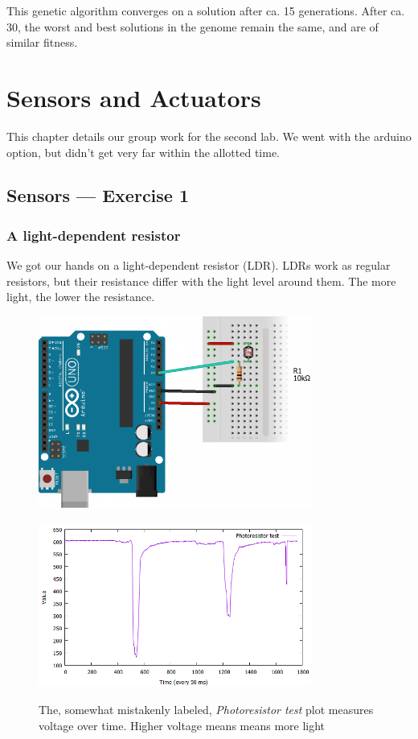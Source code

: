 \documentclass[a4paper, titlepage]{report}
\renewcommand{\%}{\scalebox{.9}{\oldpct}}
\begin{document}
This genetic algorithm converges on a solution after ca. 15 generations. After ca. 30, the worst and best solutions in the genome remain the same, and are of similar fitness.

\chapter{Sensors and Actuators}
This chapter details our group work for the second lab.
We went with the arduino option, but didn't get very far within the allotted
time.

\section*{Sensors --- Exercise 1}
\subsection*{A light-dependent resistor}
We got our hands on a light-dependent resistor (LDR). LDRs work as regular
resistors, but their resistance differ with the light level around them. The
more light, the lower the resistance. 

\begin{figure}[htbp]
\centering
\includegraphics[width=0.8\textwidth]{imgs/Photoresistor/arduino_diagram.png}
\label{fig:photo_circuit}
\caption{}
\end{figure}

\begin{figure}[htbp]
\centering
\includegraphics[width=0.8\textwidth]{imgs/Photoresistor/result_photoresistor.png}
\label{fig:photo_plot}
\caption{The, somewhat mistakenly labeled, \textit{Photoresistor test} plot measures voltage over time. Higher voltage means means more light}
\end{figure}
\end{document}
